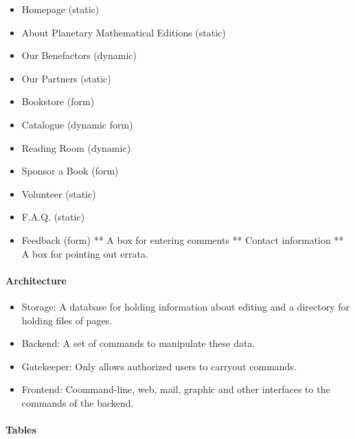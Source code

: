 \begin{itemize}
\begin{itemize}
\begin{itemize}
\item
  Homepage (static)
\item
  About Planetary Mathematical Editions (static)
\item
  Our Benefactors (dynamic)
\item
  Our Partners (static)
\item
  Bookstore (form)
\item
  Catalogue (dynamic form)
\item
  Reading Room (dynamic)
\item
  Sponsor a Book (form)
\item
  Volunteer (static)
\item
  F.A.Q. (static)
\item
  Feedback (form) ** A box for entering comments ** Contact information
  ** A box for pointing out errata.
\end{itemize}

\paragraph{Architecture}

\begin{itemize}
\item
  Storage: A database for holding information about editing and a
  directory for holding files of pages.
\item
  Backend: A set of commands to manipulate these data.
\item
  Gatekeeper: Only allows authorized users to carryout commands.
\item
  Frontend: Coommand-line, web, mail, graphic and other interfaces to
  the commands of the backend.
\end{itemize}

\paragraph{Tables}


\end{itemize}
\end{itemize}

